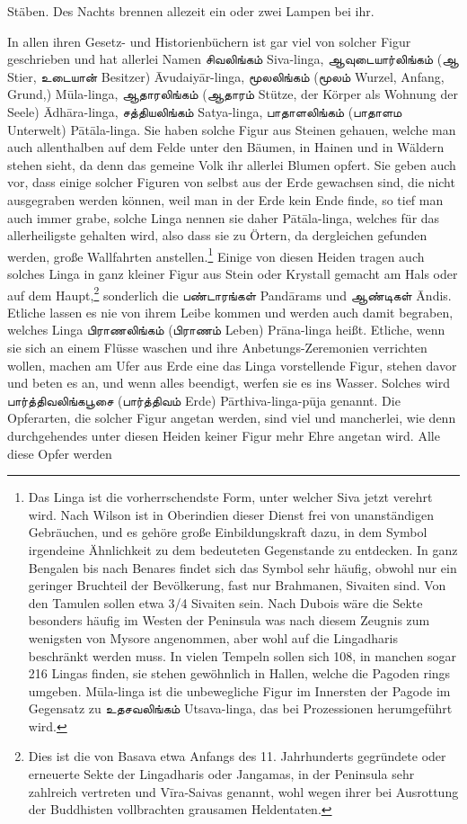 \documentclass{article}
\newcommand{\TamilText}[1]{\texttamil{#1}}
\newcommand{\tam}[1]{\TamilText{#1}}
\begin{document}
Stäben. Des Nachts brennen allezeit ein oder zwei Lampen bei ihr.

In allen ihren Gesetz- und Historienbüchern ist gar viel von solcher Figur geschrieben und hat allerlei Namen \tam{சிவலிங்கம்} Siva-linga, \tam{ஆவுடையார்லிங்கம்} (\tam{ஆ} Stier, \tam{உடையான்} Besitzer) \={A}vudaiy\={a}r-linga, \tam{மூலலிங்கம்} (\tam{மூலம்} Wurzel, Anfang, Grund,) M\={u}la-linga, \tam{ஆதாரலிங்கம்} (\tam{ஆதாரம்} Stütze, der Körper als Wohnung der Seele) \={A}dh\={a}ra-linga, \tam{சத்தியலிங்கம்} Satya-linga, \tam{பாதாளலிங்கம்} (\tam{பாதாளம} Unterwelt) P\={a}t\={a}la-linga. Sie haben solche Figur aus Steinen gehauen, welche man auch allenthalben auf dem Felde unter den Bäumen, in Hainen und in Wäldern stehen sieht, da denn das gemeine Volk ihr allerlei Blumen opfert. Sie geben auch vor, dass einige solcher Figuren von selbst aus der Erde gewachsen sind, die nicht ausgegraben werden können, weil man in der Erde kein Ende finde, so tief man auch immer grabe, solche Linga nennen sie daher P\={a}t\={a}la-linga, welches für das allerheiligste gehalten wird, also dass sie zu Örtern, da dergleichen gefunden werden, große Wallfahrten anstellen.\footnote{Das Linga ist die vorherrschendste Form, unter welcher Siva jetzt verehrt wird. Nach Wilson ist in Oberindien dieser Dienst frei von unanständigen Gebräuchen, und es gehöre große Einbildungskraft dazu, in dem Symbol irgendeine Ähnlichkeit zu dem bedeuteten Gegenstande zu entdecken. In ganz Bengalen bis nach Benares findet sich das Symbol sehr häufig, obwohl nur ein geringer Bruchteil der Bevölkerung, fast nur Brahmanen, Sivaiten sind. Von den Tamulen sollen etwa 3/4 Sivaiten sein. Nach Dubois wäre die Sekte besonders häufig im Westen der Peninsula was nach diesem Zeugnis zum wenigsten von Mysore angenommen, aber wohl auf die Lingadharis beschränkt werden muss. In vielen Tempeln sollen sich 108, in manchen sogar 216 Lingas finden, sie stehen gewöhnlich in Hallen, welche die Pagoden rings umgeben. M\={u}la-linga ist die unbewegliche Figur im Innersten der Pagode im Gegensatz zu \tam{உதசவலிங்கம்} Utsava-linga, das bei Prozessionen herumgeführt wird.} Einige von diesen Heiden tragen auch solches Linga in ganz kleiner Figur aus Stein oder Krystall gemacht am Hals oder auf dem Haupt,\footnote{Dies ist die von Basava etwa Anfangs des 11. Jahrhunderts gegründete oder erneuerte Sekte der Lingadharis oder Jangamas, in der Peninsula sehr zahlreich vertreten und V\={i}ra-Saivas genannt, wohl wegen ihrer bei Ausrottung der Buddhisten vollbrachten grausamen Heldentaten.} sonderlich die \tam{பண்டாரங்கள்} Pand\={a}rams und \tam{ஆண்டிகள்} \={A}ndis. Etliche lassen es nie von ihrem Leibe kommen und werden auch damit begraben, welches Linga \tam{பிராணலிங்கம்} (\tam{பிராணம்} Leben) Pr\={a}na-linga heißt. Etliche, wenn sie sich an einem Flüsse waschen und ihre Anbetungs-Zeremonien verrichten wollen, machen am Ufer aus Erde eine das Linga vorstellende Figur, stehen davor und beten es an, und wenn alles beendigt, werfen sie es ins Wasser. Solches wird \tam{பார்த்திவலிங்கபூசை} (\tam{பார்த்திவம்} Erde) P\={a}rthiva-linga-p\={u}ja genannt. Die Opferarten, die solcher Figur angetan werden, sind viel und mancherlei, wie denn durchgehendes unter diesen Heiden keiner Figur mehr Ehre angetan wird. Alle diese Opfer werden 
\end{document}
